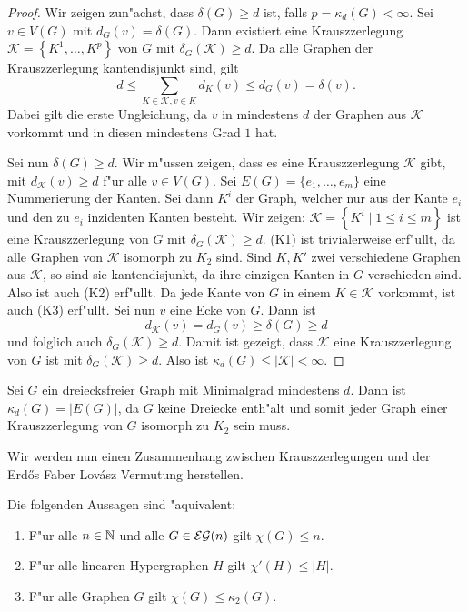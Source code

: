 \begin{proof}
  Wir zeigen zun"achst, dass $\delta(G) \geq d$ ist, falls $p = \kappa_d(G) < \infty$. Sei $v\in V(G)$ mit $d_{G}(v) = \delta(G)$. Dann existiert eine Krauszzerlegung $\mathcal{K}=\left\{ K^{1}, \dots , K^{p} \right\}$ von $G$ mit $\delta_{G}(\mathcal{K}) \geq d$. Da alle Graphen der Krauszzerlegung kantendisjunkt sind, gilt $$ d \leq \sum\limits_{K\in \mathcal{K}, v\in K} d_{K}(v) \leq d_{G}(v) = \delta(v).$$
  Dabei gilt die erste Ungleichung, da $v$ in mindestens $d$ der Graphen aus $\mathcal{K}$ vorkommt und in diesen mindestens Grad $1$ hat.

  Sei nun $\delta(G) \geq d$. Wir m"ussen zeigen, dass es eine Krauszzerlegung $\mathcal{K}$ gibt, mit
  $d_{\mathcal{K}}(v) \geq d$ f"ur alle $v\in V(G)$. Sei $E(G)= \{e_1,\dots, e_{m}\}$ eine Nummerierung der Kanten. Sei dann $K^i$ der Graph, welcher nur aus der Kante $e_i$ und den zu $e_i$ inzidenten Kanten besteht. Wir zeigen: $\mathcal{K} = \left\{ K^i \;|\; 1 \leq i \leq m \right\}$ ist eine Krauszzerlegung von $G$ mit $\delta_{G}(\mathcal{K}) \geq d$. (K1) ist trivialerweise erf"ullt, da alle Graphen von $\mathcal{K}$ isomorph zu $K_{2}$ sind. Sind $K,K'$ zwei verschiedene Graphen aus $\mathcal{K}$, so sind sie
  kantendisjunkt, da ihre einzigen Kanten in $G$ verschieden sind. Also ist auch (K2) erf"ullt. Da jede Kante von $G$ in einem $K\in \mathcal{K}$ vorkommt, ist auch (K3) erf"ullt. Sei nun $v$ eine Ecke von $G$. Dann ist $$d_{\mathcal{K}}(v) = d_{G}(v) \geq \delta(G) \geq d$$ und folglich auch $\delta_{G}(\mathcal{K}) \geq d$. Damit ist gezeigt, dass $\mathcal{K}$ eine Krauszzerlegung von $G$ ist mit $\delta_{G}\left( \mathcal{K} \right) \geq d$. Also ist
  $\kappa_{d}(G) \leq |\mathcal{K}| <
  \infty$.
\end{proof}

\begin{example}
  Sei $G$ ein dreiecksfreier Graph mit Minimalgrad mindestens $d$. Dann ist $\kappa_{d}(G) = |E(G)|$, da $G$ keine Dreiecke enth"alt und somit jeder Graph einer Krauszzerlegung von $G$ isomorph zu $K_{2}$ sein muss. 
\end{example}

Wir werden nun einen Zusammenhang zwischen Krauszzerlegungen und der Erd\H{o}s Faber Lov\'asz Vermutung herstellen.

\begin{theorem}
  Die folgenden Aussagen sind "aquivalent:
  \begin{enumerate}[label=\rm{(\alph*)}]
    \item F"ur alle $n\in{\mathbb{N}}$ und alle $G\in{\cal EG}(n)$ gilt $\chi(G) \leq n$.
    \item F"ur alle linearen Hypergraphen $H$ gilt $\chi'(H) \leq |H|$.
    \item F"ur alle Graphen $G$ gilt $\chi(G) \leq \kappa_{2}(G)$.
  \end{enumerate}
  \label{thm:equivefl}
\end{theorem}


